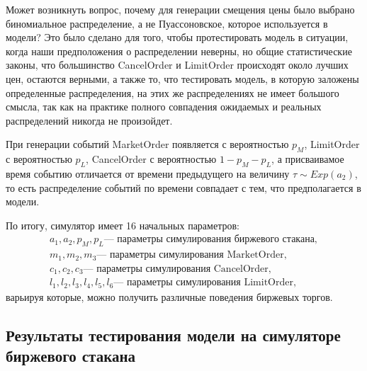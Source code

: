 \documentclass[12pt, a4paper]{article}
\begin{document}
Может возникнуть вопрос, почему для генерации смещения цены было выбрано биномиальное распределение, а не Пуассоновское, которое используется в модели? Это было сделано для того, чтобы протестировать модель в ситуации, когда наши предположения о распределении неверны, но общие статистические законы, что большинство CancelOrder и LimitOrder происходят около лучших цен, остаются верными, а также то, что тестировать модель, в которую заложены определенные распределения, на этих же распределениях не имеет большого смысла, так как на практике полного совпадения ожидаемых и реальных распределений никогда не произойдет.

При генерации событий MarketOrder появляется с вероятностью $p_M$, LimitOrder с вероятностью $p_L$, CancelOrder с вероятностью $1 - p_M - p_L$, а присваивамое время событию отличается от времени предыдущего на величину $\tau \sim Exp(a_2)$, то есть распределение событий по времени совпадает с тем, что предполагается в модели.

По итогу, симулятор имеет 16 начальных параметров: 
\[
\begin{array}{c}
a_1, a_2, p_M, p_L \text{--- параметры симулирования биржевого стакана}, \\
m_1, m_2, m_3 \text{--- параметры симулирования MarketOrder}, \\
c_1, c_2, c_3 \text{--- параметры симулирования CancelOrder}, \\
l_1, l_2, l_3, l_4, l_5, l_6 \text{--- параметры симулирования LimitOrder},
\end{array}
\]
варьируя которые, можно получить различные поведения биржевых торгов.

\subsection{Результаты тестирования модели на симуляторе биржевого стакана}




\begin{comment}

\hypertarget{qrm}
\hypertarget{binance_api}
\hypertarget{hotteling}
\end{comment}
\end{document}
